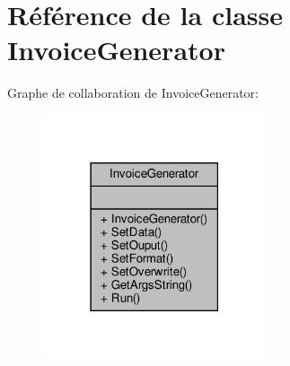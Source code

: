 \hypertarget{class_invoice_generator}{}\section{Référence de la classe Invoice\+Generator}
\label{class_invoice_generator}


Graphe de collaboration de Invoice\+Generator\+:
\nopagebreak
\begin{figure}[H]
\begin{center}
\leavevmode
\includegraphics[width=186pt]{class_invoice_generator__coll__graph}
\end{center}
\end{figure}
